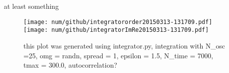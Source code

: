 at least something\\ 
\begin{figure}[h!]\centering\texttt{[image: num/github/integratororder20150313-131709.pdf]}\texttt{[image: num/github/integratorImRe20150313-131709.pdf]}\caption{this plot was generated using integrator.py, integration with N\_osc =25, omg = randn, spread = 1, epsilon = 1.5, N\_time = 7000, tmax = 300.0, autocorrelation?}\end{figure}


